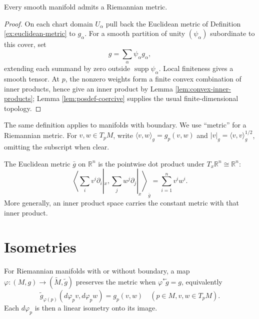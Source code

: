 \begin{proposition}
\label{prop:existence-riemannian-metric}





Every smooth manifold admits a Riemannian metric.
\end{proposition}
\begin{proof}

\sketch On each chart domain $U_\alpha$ pull back the Euclidean metric of Definition \ref{ex:euclidean-metric} to $g_\alpha$. For a smooth partition of unity $(\psi_\alpha)$ subordinate to this cover, set
\[
g=\sum_\alpha\psi_\alpha g_\alpha,
\]
extending each summand by zero outside $\operatorname{supp}\psi_\alpha$. Local finiteness gives a smooth tensor. At $p$, the nonzero weights form a finite convex combination of inner products, hence give an inner product by Lemma \ref{lem:convex-inner-products}; Lemma \ref{lem:posdef-coercive} supplies the usual finite-dimensional topology.
\end{proof}

The same definition applies to manifolds with boundary. We use ``metric'' for a Riemannian metric. For $v,w\in T_pM$, write $\langle v,w\rangle_g=g_p(v,w)$ and $|v|_g=\langle v,v\rangle_g^{1/2}$, omitting the subscript when clear.

\begin{definition}
\label{ex:euclidean-metric}





The Euclidean metric $\bar g$ on $\mathbb R^n$ is the pointwise dot product under $T_x\mathbb R^n\cong\mathbb R^n$:
\[
\left\langle\sum_i v^i\partial_i|_x,\sum_j w^j\partial_j|_x\right\rangle_{\bar g}=\sum_{i=1}^n v^i w^i.
\]
More generally, an inner product space carries the constant metric with that inner product.
\end{definition}

\section{Isometries}

\begin{definition}
\label{def:metric-preserving}





For Riemannian manifolds with or without boundary, a map $\varphi:(M,g)\to(\widetilde M,\widetilde g)$ preserves the metric when $\varphi^*\widetilde g=g$, equivalently
\[
\widetilde g_{\varphi(p)}(d\varphi_pv,d\varphi_pw)=g_p(v,w)
\quad(p\in M, v,w\in T_pM).
\]
Each $d\varphi_p$ is then a linear isometry onto its image.
\end{definition}


